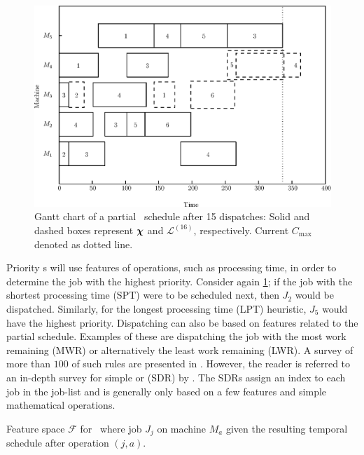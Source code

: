 \documentclass[twocolumn]{svjour3}
\begin{document}
\begin{figure}[t!]\centering
\includegraphics[width=\columnwidth]{figures/jssp_example}
\caption[Gantt chart of a partial \JSP\ schedule]{Gantt chart of a
partial \JSP\ schedule after 15 dispatches: Solid and dashed boxes
represent $\bm \chi$ and $\mathcal{L}^{(16)}$, respectively. Current
$C_{\max}$ denoted as dotted line.}
\label{fig:jssp:example}
\end{figure}


Priority \dr s will use features of operations, such as processing time, 
in order to determine the job with the highest priority. 
Consider again \cref{fig:jssp:example}; if the job with the shortest processing 
time (SPT) were to be scheduled next, then $J_2$ would be dispatched. 
Similarly, for the longest processing time (LPT) heuristic, $J_5$ would have 
the highest priority. 
Dispatching can also be based on features related to the partial schedule. 
Examples of these are dispatching the job with the most work remaining (MWR) or 
alternatively the least work remaining (LWR). A survey of more than $100$ of 
such rules are presented in \cite{Panwalkar77}. 
However, the reader is referred to an in-depth survey for simple or 
\emph{\sdr} (SDR) by \cite{Haupt89}. 
The SDRs assign an index to each job in the job-list and is generally only 
based on a few features and simple mathematical operations.

\begin{table}[t!] \centering
\caption[Feature space $\mathcal{F}$ for \JSP]{Feature space 
$\mathcal{F}$ for \JSP\ where job $J_j$ on machine $M_a$ given the 
resulting temporal schedule after operation $(j,a)$.
}
\label{tbl:jssp:feat}
{\setlength{\tabcolsep}{3pt} }
\end{table}
\end{document}
